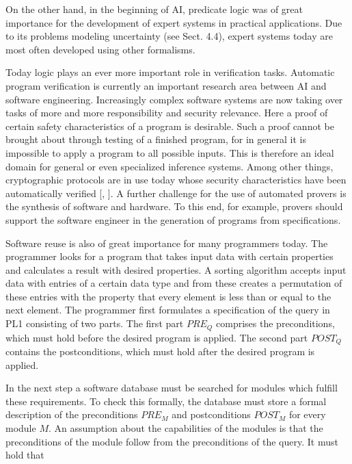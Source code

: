 \documentclass[10pt]{article}
\begin{document}
On the other hand, in the beginning of AI, predicate logic was of great importance for the development of expert systems in practical applications. Due to its problems modeling uncertainty (see Sect. 4.4), expert systems today are most often developed using other formalisms.


Today logic plays an ever more important role in verification tasks. Automatic program verification is currently an important research area between AI and software engineering. Increasingly complex software systems are now taking over tasks of more and more responsibility and security relevance. Here a proof of certain safety characteristics of a program is desirable. Such a proof cannot be brought about through testing of a finished program, for in general it is impossible to apply a program to all possible inputs. This is therefore an ideal domain for general or even specialized inference systems. Among other things, cryptographic protocols are in use today whose security characteristics have been automatically verified [\cite{fischer1997setheo}, \cite{schumann2001automated}]. A further challenge for the use of automated provers is the synthesis of software and hardware. To this end, for example, provers should support the software engineer in the generation of programs from specifications.

Software reuse is also of great importance for many programmers today. The programmer looks for a program that takes input data with certain properties and calculates a result with desired properties. A sorting algorithm accepts input data with entries of a certain data type and from these creates a permutation of these entries with the property that every element is less than or equal to the next element. The programmer first formulates a specification of the query in PL1 consisting of two parts. The first part $P R E_{Q}$ comprises the preconditions, which must hold before the desired program is applied. The second part $P O S T_{Q}$ contains the postconditions, which must hold after the desired program is applied.

In the next step a software database must be searched for modules which fulfill these requirements. To check this formally, the database must store a formal description of the preconditions $P R E_{M}$ and postconditions $P O S T_{M}$ for every module $M$. An assumption about the capabilities of the modules is that the preconditions of the module follow from the preconditions of the query. It must hold that
\end{document}
